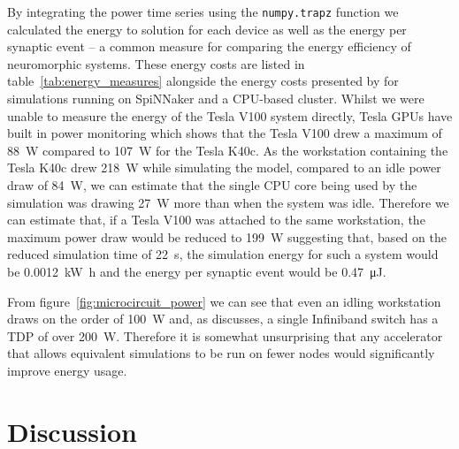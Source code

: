 \documentclass[utf8]{frontiersSCNS} %
\begin{document}
By integrating the power time series using the \lstinline{numpy.trapz} function we calculated the energy to solution for each device as well as the energy per synaptic event -- a common measure for comparing the energy efficiency of neuromorphic systems.
These energy costs are listed in table~\ref{tab:energy_measures} alongside the energy costs presented by \citet{VanAlbada2018} for simulations running on SpiNNaker and a CPU-based cluster.
Whilst we were unable to measure the energy of the Tesla V100 system directly, Tesla GPUs have built in power monitoring which shows that the Tesla V100 drew a maximum of \SI{88}{\watt} compared to \SI{107}{\watt} for the Tesla K40c.
As the workstation containing the Tesla K40c drew \SI{218}{\watt} while simulating the model, compared to an idle power draw of \SI{84}{\watt}, we can estimate that the single CPU core being used by the simulation was drawing \SI{27}{\watt} more than when the system was idle.
Therefore we can estimate that, if a Tesla V100 was attached to the same workstation, the maximum power draw would be reduced to \SI{199}{\watt} suggesting that, based on the reduced simulation time of \SI{22}{\second}, the simulation energy for such a system would be \SI{0.0012}{\kilo\watt\hour} and the energy per synaptic event would be \SI{0.47}{\micro\joule}.

From figure~\ref{fig:microcircuit_power} we can see that even an idling workstation draws on the order of \SI{100}{\watt} and, as \citeauthor{VanAlbada2018} discusses, a single Infiniband switch has a TDP of over \SI{200}{\watt}.
Therefore it is somewhat unsurprising that any accelerator that allows equivalent simulations to be run on fewer nodes would significantly improve energy usage.

\section{Discussion}
\end{document}
